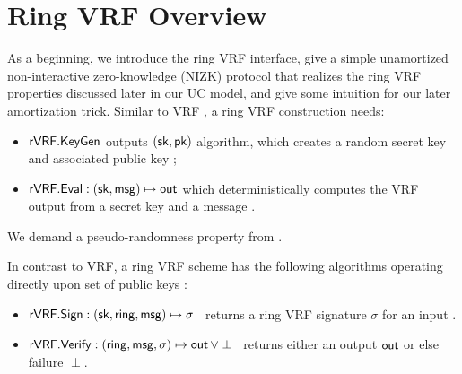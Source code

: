 \section{Ring VRF Overview}
\label{sec:overview}

As a beginning, we introduce the ring VRF interface, give a simple
unamortized non-interactive zero-knowledge (NIZK) protocol that
realizes the ring VRF properties discussed later in our UC model,
and give some intuition for our later amortization trick.
Similar to VRF \cite{vrf_micali}, a ring VRF construction needs: 

\begin{itemize}
\item ${\mathsf{rVRF}}.{\mathsf{KeyGen}} $ outputs $ (\mathsf{sk}, \mathsf{pk})$ algorithm,
 which creates a random secret key \sk and associated public key \pk;

\item ${\mathsf{rVRF}}.{\mathsf{Eval}} : (\mathsf{sk},\mathsf{msg}) \mapsto {\ensuremath{\mathsf{out}}}$ which deterministically computes the VRF output \Out from a secret key \sk and a message \msg.
\end{itemize}
%


We demand a pseudo-randomness property from \Eval. 


In contrast to VRF, a ring VRF scheme has the following algorithms operating directly upon
 set of public keys \ring:
\begin{itemize}
\item ${\mathsf{rVRF}}.{\mathsf{Sign}} : (\mathsf{sk},\mathsf{ring},\mathsf{msg}) \mapsto \sigma$ \,
    returns a ring VRF signature $\sigma$ for an input \msg.
\item ${\mathsf{rVRF}}.{\mathsf{Verify}} : (\mathsf{ring},\mathsf{msg},\sigma) \mapsto {\ensuremath{\mathsf{out}}} \, \lor \perp$ \,
    returns either an output ${\mathsf{out}}$ or else failure $\perp$.
\end{itemize}

